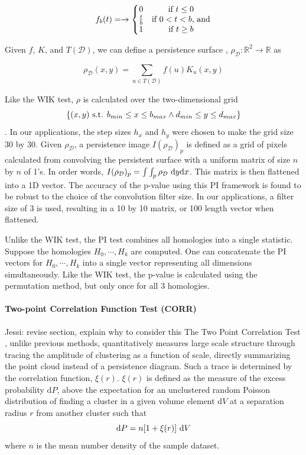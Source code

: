 \documentclass[12pt]{article}
\begin{document}
\[ f_{b}(t) = \rightarrow \left\{\begin{matrix}
0 & \textup{if } t \leq 0 \\ 
\frac{t}{b} & \textup{if } 0 < t < b\textup{, and}\\ 
1 & \textup{if } t \geq b 
\end{matrix}\right. \]

Given $f$, $K$, and $T(\mathcal{D})$, we can define a persistence surface \citep{adams2015persistent}, $\rho_{\mathcal{D}} : \mathbb{R}^{2} \rightarrow \mathbb{R}$ as 

\[ \rho_{\mathcal{D}}(x, y) = \sum_{u \in T(\mathcal{D})} f(u)K_{u}(x,y) \]

Like the WIK test, $\rho$ is calculated over the two-dimensional grid \[ \{ (x, y) \textup{ s.t. } b_{min} \leq x \leq b_{max} \wedge d_{min} \leq y \leq d_{max} \} \]. In our applications, the step sizes $h_{x}$ and $h_{y}$ were chosen to make the grid size 30 by 30. Given $\rho_{\mathcal{D}}$, a persistence image \citep{adams2015persistent} $I(\rho_{\mathcal{D}})_{p}$ is defined as a grid of pixels calculated from convolving the persistent surface with a uniform matrix of size $n$ by $n$ of 1's. In order words, $I(\rho_{\mathcal{D}})_{p} = \int\int_{p} \rho_{\mathcal{D}} \textup{ d}y\textup{d}x$. This matrix is then flattened into a 1D vector.  The accuracy of the p-value using this PI framework is found to be robust to the choice of the convolution filter size. In our applications, a filter size of 3 is used, resulting in a 10 by 10 matrix, or 100 length vector when flattened.

Unlike the WIK test, the PI test combines all homologies into a single statistic. Suppose the homologies $H_{0}, \cdots, H_{k}$ are computed. One can concatenate the PI vectors for $H_{0}, \cdots, H_{k}$ into a single vector representing all dimensions simultaneously. Like the WIK test, the p-value is calculated using the permutation method, but only once for all 3 homologies.

\paragraph{Two-point Correlation Function Test (CORR)}
{\color{red}  Jessi:  revise section, explain why to consider this}
The Two Point Correlation Test \citep{landy1993bias}, unlike previous methods, quantitatively measures large scale structure through tracing the amplitude of clustering as a function of scale, directly summarizing the point cloud instead of a persistence diagram. Such a trace is determined by the correlation function, $\xi(r)$. $\xi(r)$ is defined as the measure of the excess probability d$P$, above the expectation for an unclustered random Poisson distribution of finding a cluster in a given volume element d$V$ at a separation radius $r$ from another cluster such that 
\[ \textup{d}P = n[1 + \xi(r)] \textup{ d}V \] where $n$ is the mean number density of the sample dataset.
\end{document}

